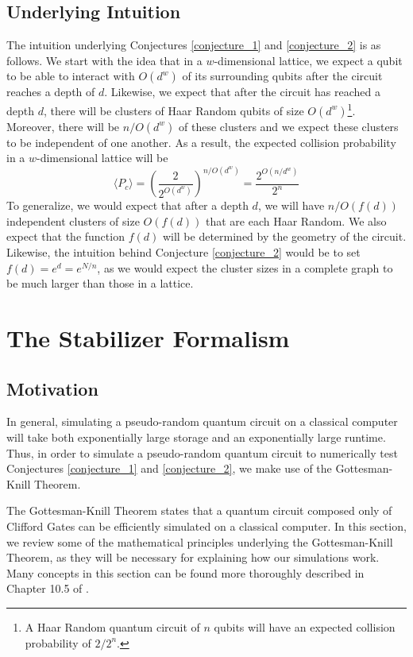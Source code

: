\documentclass[11pt]{article}
\theoremstyle{definition}
\theoremstyle{plain}
\begin{document}
\subsection{Underlying Intuition}
The intuition underlying Conjectures {\ref{conjecture_1}} and {\ref{conjecture_2}} is as follows. We start with the idea that in a $w$-dimensional lattice, we expect a qubit to be able to interact with $O(d^w)$ of its surrounding qubits after the circuit reaches a depth of $d$. Likewise, we expect that after the circuit has reached a depth $d$, there will be clusters of Haar Random qubits of size $O(d^w)$\footnote{A Haar Random quantum circuit of $n$ qubits will have an expected collision probability of $2 / 2^n$.}. Moreover, there will be $n / O(d^w)$ of these clusters and we expect these clusters to be independent of one another. As a result, the expected collision probability in a $w$-dimensional lattice will be
\begin{equation}
  \langle P_c \rangle = {\left( \frac{2}{2^{O(d^w)}} \right)}^{n / O(d^w)}
  = \frac{2^{O(n/d^w)}}{2^n}
\end{equation}
To generalize, we would expect that after a depth $d$, we will have $n / O(f(d))$ independent clusters of size $O(f(d))$ that are each Haar Random. We also expect that the function $f(d)$ will be determined by the geometry of the circuit. Likewise, the intuition behind Conjecture {\ref{conjecture_2}} would be to set $f(d) = e^{d} = e^{N/n}$, as we would expect the cluster sizes in a complete graph to be much larger than those in a lattice. 

\section{The Stabilizer Formalism}

\subsection{Motivation}
In general, simulating a pseudo-random quantum circuit on a classical computer will take both exponentially large storage and an exponentially large runtime. Thus, in order to simulate a pseudo-random quantum circuit to numerically test Conjectures {\ref{conjecture_1}} and {\ref{conjecture_2}}, we make use of the Gottesman-Knill Theorem.

The Gottesman-Knill Theorem states that a quantum circuit composed only of Clifford Gates can be efficiently simulated on a classical computer. In this section, we review some of the mathematical principles underlying the Gottesman-Knill Theorem, as they will be necessary for explaining how our simulations work. Many concepts in this section can be found more thoroughly described in Chapter 10.5 of {\cite{nc}}. 
\end{document}
